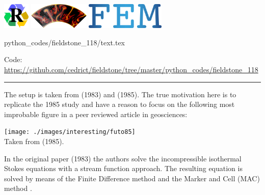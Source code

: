 \includegraphics[height=1.25cm]{images/pictograms/replication}
\includegraphics[height=1.25cm]{images/pictograms/aspect_logo}
\includegraphics[height=1.25cm]{images/pictograms/FEM}


\begin{flushright} {\tiny {\color{gray} python\_codes/fieldstone\_118/text.tex}} \end{flushright}



\begin{center}
\inpython
{\small Code: \url{https://github.com/cedrict/fieldstone/tree/master/python_codes/fieldstone_118}}
\end{center}

\par\noindent\rule{\textwidth}{0.4pt}


The setup is taken from \textcite{mato83} (1983) and \textcite{futo85} (1985).
The true motivation here is to replicate the 1985 study 
and have a reason to focus on the following most improbable figure in a peer reviewed
article in geosciences:

\begin{center}
\texttt{[image: ./images/interesting/futo85]}\\
{\captionfont Taken from \textcite{futo85} (1985).}
\end{center}

In the original paper (1983) the authors solve the incompressible isothermal Stokes equations
with a stream function approach. The resulting equation is solved by means of the
Finite Difference method and the Marker and Cell (MAC) method \cite{hawe65}.

